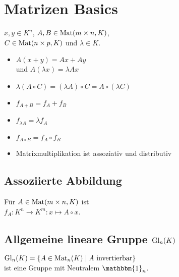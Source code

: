 \section*{Matrizen Basics}

$x,y\in K^n$, $A,B\in\operatorname{Mat}(m\times n,K)$, \\
$C\in\operatorname{Mat}(n\times p, K)$ und $\lambda\in K$.

\begin{itemize}
	\item $A(x+y)=Ax + Ay$\\ und $A(\lambda x) = \lambda Ax$
	\item $\lambda(A\circ C) = (\lambda A)\circ C = A\circ (\lambda C)$
	\item $f_{A+B}=f_A + f_B$
	\item $f_{\lambda A} = \lambda f_A$
	\item $f_{A \circ B} = f_A \circ f_B$
	\item Matrixmultiplikation ist assoziativ und distributiv
\end{itemize}

\subsection*{Assoziierte Abbildung}
Für $A\in\operatorname{Mat}(m \times n, K)$ ist \\
$f_A: K^n \to K^m: x \mapsto A \circ x$.

\subsection*{Allgemeine lineare Gruppe $\operatorname{Gl}_n(K)$}
$\operatorname{Gl}_n(K) = \{A \in \operatorname{Mat}_n(K) \mid A \text{ invertierbar}\}$ \\
ist eine Gruppe mit Neutralem $\mathbbm{1}_n$.
